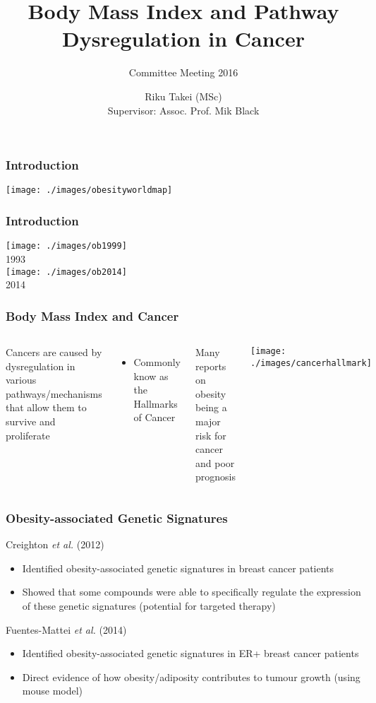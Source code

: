 \documentclass[handout]{beamer}
\title[BMI and Cancer Pathway]{Body Mass Index and Pathway Dysregulation in Cancer}
\subtitle{Committee Meeting 2016}
\author[Riku Takei]{Riku Takei (MSc)\\Supervisor: Assoc. Prof. Mik Black}
\institute{Department of Biochemistry, University of Otago}
\begin{document}
{
	\begin{frame}[noframenumbering]
		\titlepage
	\end{frame}
}

\begin{frame}
\frametitle{Introduction}
\begin{center}
	\texttt{[image: ./images/obesityworldmap]}
\end{center}
\end{frame}

\begin{frame}
\frametitle{Introduction}
\begin{center}
	\texttt{[image: ./images/ob1999]}\\
	1993\\
	\texttt{[image: ./images/ob2014]}\\
	2014
\end{center}
\end{frame}

\begin{frame}
	\frametitle{Body Mass Index and Cancer}
	\begin{columns}
		{\footnotesize
			Cancers are caused by dysregulation in various pathways/mechanisms that allow them to survive and proliferate
			\begin{itemize}
				\item Commonly know as the Hallmarks of Cancer \citep{Hanahan2011}
			\end{itemize}
			Many reports on obesity being a major risk for cancer and poor prognosis
		}
		\texttt{[image: ./images/cancerhallmark]}
	\end{columns}
\end{frame}

\begin{frame}
	\frametitle{Obesity-associated Genetic Signatures}
	Creighton \textit{et al.} (2012)
	\begin{itemize}
		\item Identified obesity-associated genetic signatures in breast cancer patients
		\item Showed that some compounds were able to specifically regulate the expression of these genetic signatures (potential for targeted therapy)
	\end{itemize}
	Fuentes-Mattei \textit{et al.} (2014)
	\begin{itemize}
		\item Identified obesity-associated genetic signatures in ER+ breast cancer patients
		\item Direct evidence of how obesity/adiposity contributes to tumour growth (using mouse model)
	\end{itemize}
\end{frame}
\end{document}
